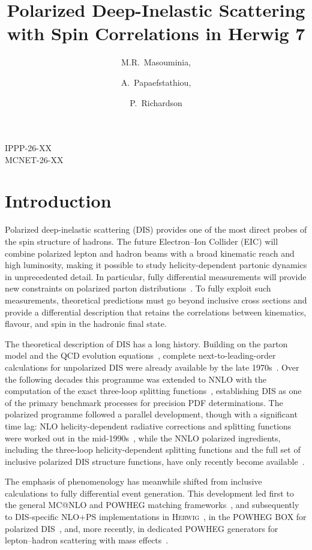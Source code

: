\documentclass[a4paper,11pt]{article}
\title{\boldmath Polarized Deep-Inelastic Scattering with Spin Correlations in Herwig 7}
\author[1]{M.R.~Masouminia,}
\author[2]{A.~Papaefstathiou,}
\author[1]{P.~Richardson}
\affiliation[1]{Institute for Particle Physics Phenomenology, Durham University, Durham, UK}
\affiliation[2]{Department of Physics, Kennesaw State University, 830 Polytechnic Lane, Marietta, GA 30060, USA}
\newcommand{\Herwig}{\textsc{Herwig}}
\begin{document}
\begin{flushright}
\footnotesize

IPPP-26-XX\\
MCNET-26-XX

\end{flushright}


\maketitle
\flushbottom

\section{Introduction}\label{sec:intro}

Polarized deep-inelastic scattering (DIS) provides one of the most direct probes of the spin structure of hadrons. The future Electron--Ion Collider (EIC) will combine polarized lepton and hadron beams with a broad kinematic reach and high luminosity, making it possible to study helicity-dependent partonic dynamics in unprecedented detail. In particular, fully differential measurements will provide new constraints on polarized parton distributions~\cite{Accardi:2012qut,AbdulKhalek:2021gbh}. To fully exploit such measurements, theoretical predictions must go beyond inclusive cross sections and provide a differential description that retains the correlations between kinematics, flavour, and spin in the hadronic final state.

The theoretical description of DIS has a long history. Building on the parton model and the QCD evolution equations~\cite{Altarelli:1977zs}, complete next-to-leading-order calculations for unpolarized DIS were already available by the late 1970s~\cite{Bardeen:1978yd}. Over the following decades this programme was extended to NNLO with the computation of the exact three-loop splitting functions~\cite{Moch:2004pa,Vogt:2004mw}, establishing DIS as one of the primary benchmark processes for precision PDF determinations. The polarized programme followed a parallel development, though with a significant time lag: NLO helicity-dependent radiative corrections and splitting functions were worked out in the mid-1990s~\cite{Mertig:1995ny,Vogelsang:1996im}, while the NNLO polarized ingredients, including the three-loop helicity-dependent splitting functions and the full set of inclusive polarized DIS structure functions, have only recently become available~\cite{Moch:2014sna,Borsa:2022nnlo}.

The emphasis of phenomenology has meanwhile shifted from inclusive calculations to fully differential event generation. This development led first to the general MC@NLO and POWHEG matching frameworks~\cite{Frixione:2002ik,Nason:2004rx,Frixione:2007vw}, and subsequently to DIS-specific NLO+PS implementations in \Herwig~\cite{DErrico:2011wfa}, in the POWHEG BOX for polarized DIS~\cite{Borsa:2024ps}, and, more recently, in dedicated POWHEG generators for lepton--hadron scattering with mass effects~\cite{Buonocore:2024dis}.
\end{document}
